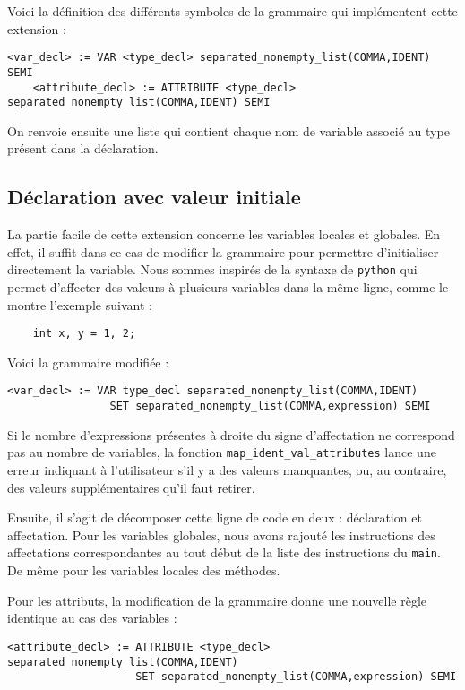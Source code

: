 \documentclass{article}
\begin{document}
Voici la définition des différents symboles de la grammaire qui implémentent cette extension : 
\begin{lstlisting}[style=mystyle]
    <var_decl> := VAR <type_decl> separated_nonempty_list(COMMA,IDENT) SEMI
    <attribute_decl> := ATTRIBUTE <type_decl> separated_nonempty_list(COMMA,IDENT) SEMI
\end{lstlisting}

On renvoie ensuite une liste qui contient chaque nom de variable associé 
au type présent dans la déclaration.


\subsection{Déclaration avec valeur initiale}
La partie facile de cette extension concerne les variables locales et globales.
En effet, il suffit dans ce cas de modifier la grammaire pour permettre d'initialiser directement la variable.
Nous sommes inspirés de la syntaxe de \texttt{python} qui permet d'affecter des valeurs 
à plusieurs variables dans la même ligne, comme le montre l'exemple suivant : 
\begin{verbatim}
    int x, y = 1, 2;
\end{verbatim}
Voici la grammaire modifiée : 
\begin{lstlisting}[style=mystyle]
    <var_decl> := VAR type_decl separated_nonempty_list(COMMA,IDENT) 
                SET separated_nonempty_list(COMMA,expression) SEMI
\end{lstlisting}
Si le nombre d'expressions présentes à droite du signe d'affectation ne 
correspond pas au nombre de variables, la fonction \texttt{map\_ident\_val\_attributes} 
lance une erreur indiquant à l'utilisateur 
s'il y a des valeurs manquantes, ou, 
au contraire, des valeurs supplémentaires qu'il faut retirer.


Ensuite, il s'agit de décomposer cette ligne de code en deux : déclaration et affectation. 
Pour les variables globales, nous avons rajouté les instructions des affectations correspondantes 
au tout début de la liste des instructions du \texttt{main}. 
De même pour les variables locales des méthodes.

\bigbreak
Pour les attributs, la modification de la grammaire donne une
nouvelle règle identique au cas des variables :
\begin{lstlisting}[style=mystyle]
    <attribute_decl> := ATTRIBUTE <type_decl> separated_nonempty_list(COMMA,IDENT) 
                    SET separated_nonempty_list(COMMA,expression) SEMI
\end{lstlisting}
\end{document}
